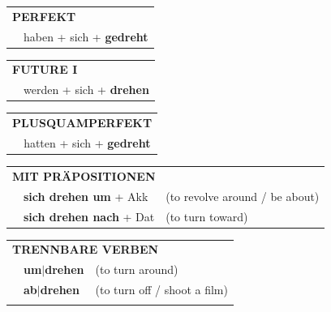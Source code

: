 \documentclass[10pt,a4paper]{revtex4-2}
\begin{document}
\begin{verbbox}
 \begin{tabular}{rl}
     \multicolumn{2}{l}{\textbf{PERFEKT}}\\
   & haben + sich + \textbf{gedreht}\\
  \end{tabular}
\hfill
   \begin{tabular}{rl}
    \multicolumn{2}{l}{\textbf{FUTURE I} }\\
   & werden + sich + \textbf{drehen}\\
  \end{tabular}
\hfill
   \begin{tabular}{rl}
      \multicolumn{2}{l}{\textbf{PLUSQUAMPERFEKT}}\\
   & hatten + sich + \textbf{gedreht}\\
  \end{tabular}

   \vspace{10pt}

   \begin{tabular}{lll}
      \multicolumn{3}{l}{\textbf{MIT PRÄPOSITIONEN}}\\
& \textbf{sich drehen um} + Akk & (to revolve around / be about)\\
& \textbf{sich drehen nach} + Dat & (to turn toward)\\
\end{tabular}
  \hfill
   \begin{tabular}{lll}
      \multicolumn{3}{l}{\textbf{TRENNBARE VERBEN}}\\
 & \textbf{um$|$drehen} & (to turn around)\\
 & \textbf{ab$|$drehen} & (to turn off / shoot a film)\\
\vspace{10pt}
  \end{tabular}

  \vspace{-5pt}

\end{verbbox}
\end{document}
